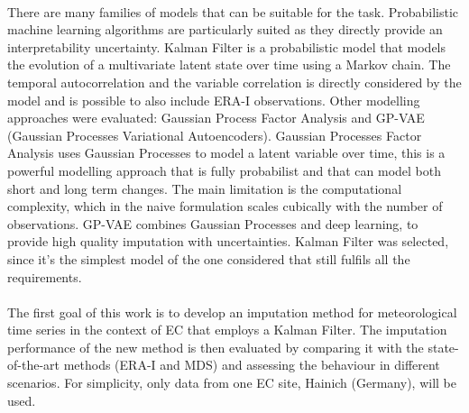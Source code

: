 \documentclass{article}
\begin{document}
\paragraph{} There are many families of models that can be suitable for the task. Probabilistic machine learning algorithms are particularly suited as they directly provide an interpretability uncertainty.
Kalman Filter is a probabilistic model that models the evolution of a multivariate latent state over time using a Markov chain. The temporal autocorrelation and the variable correlation is directly considered by the model and is possible to also include ERA-I observations.
Other modelling approaches were evaluated: Gaussian Process Factor Analysis and GP-VAE (Gaussian Processes Variational Autoencoders). Gaussian Processes Factor Analysis \cite{yu_gaussian-process_2008} uses Gaussian Processes to model a latent variable over time, this is a powerful modelling approach that is fully probabilist and that can model both short and long term changes. The main limitation is the computational complexity, which in the naive formulation scales cubically with the number of observations.
GP-VAE \cite{fortuin_gp-vae_2020} combines Gaussian Processes and deep learning, to provide high quality imputation with uncertainties.
Kalman Filter was selected, since it's the simplest model of the one considered that still fulfils all the requirements.

\paragraph{} The first goal of this work is to develop an imputation method for meteorological time series in the context of EC that employs a Kalman Filter. The imputation performance of the new method is then evaluated by comparing it with the state-of-the-art methods (ERA-I and MDS) and assessing the behaviour in different scenarios. For simplicity, only data from one EC site, Hainich (Germany), will be used.
\end{document}
